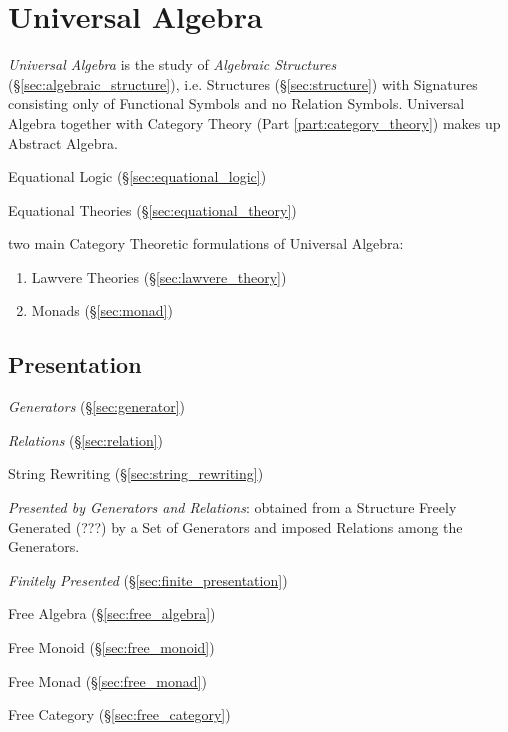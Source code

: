 \section{Universal Algebra}\label{sec:universal_algebra}

\emph{Universal Algebra} is the study of \emph{Algebraic Structures}
(\S\ref{sec:algebraic_structure}), i.e. Structures (\S\ref{sec:structure}) with
Signatures consisting only of Functional Symbols and no Relation Symbols.
Universal Algebra together with Category Theory (Part
\ref{part:category_theory}) makes up Abstract Algebra.

Equational Logic (\S\ref{sec:equational_logic})

Equational Theories (\S\ref{sec:equational_theory})

two main Category Theoretic formulations of Universal Algebra:
\begin{enumerate}
  \item Lawvere Theories (\S\ref{sec:lawvere_theory})
  \item Monads (\S\ref{sec:monad})
\end{enumerate}



\subsection{Presentation}\label{sec:presentation}

\emph{Generators} (\S\ref{sec:generator})

\emph{Relations} (\S\ref{sec:relation})

String Rewriting (\S\ref{sec:string_rewriting}) %

\emph{Presented by Generators and Relations}: obtained from a Structure Freely
Generated (???) by a Set of Generators and imposed Relations among the
Generators.

\emph{Finitely Presented} (\S\ref{sec:finite_presentation})

Free Algebra (\S\ref{sec:free_algebra})

Free Monoid (\S\ref{sec:free_monoid})

Free Monad (\S\ref{sec:free_monad})

Free Category (\S\ref{sec:free_category})

